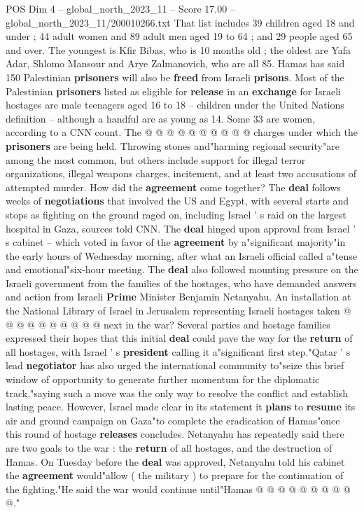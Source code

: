 \begin{textsample}{POS Dim 4 – global\_north\_2023\_11 – Score 17.00 – global\_north\_2023\_11/200010266.txt}
That list includes 39 children aged 18 and under ; 44 adult women and 89 adult men aged 19 to 64 ; and 29 people aged 65 and over.
The youngest is Kfir Bibas, who is 10 months old ; the oldest are Yafa Adar, Shlomo Mansour and Arye Zalmanovich, who are all 85.
Hamas has said 150 Palestinian \textbf{prisoners} will also be \textbf{freed} from Israeli \textbf{prisons}.
Most of the Palestinian \textbf{prisoners} listed as eligible for \textbf{release} in an \textbf{exchange} for Israeli hostages are male teenagers aged 16 to 18 -- children under the United Nations definition -- although a handful are as young as 14.
Some 33 are women, according to a CNN count.
The @ @ @ @ @ @ @ @ @ @ charges under which the \textbf{prisoners} are being held.
Throwing stones and"harming regional security"are among the most common, but others include support for illegal terror organizations, illegal weapons charges, incitement, and at least two accusations of attempted murder.
How did the \textbf{agreement} come together?
The \textbf{deal} follows weeks of \textbf{negotiations} that involved the US and Egypt, with several starts and stops as fighting on the ground raged on, including Israel ' s raid on the largest hospital in Gaza, sources told CNN.
The \textbf{deal} hinged upon approval from Israel ' s cabinet -- which voted in favor of the \textbf{agreement} by a"significant majority"in the early hours of Wednesday morning, after what an Israeli official called a"tense and emotional"six-hour meeting.
The \textbf{deal} also followed mounting pressure on the Israeli government from the families of the hostages, who have demanded answers and action from Israeli \textbf{Prime} Minister Benjamin Netanyahu.
An installation at the National Library of Israel in Jerusalem representing Israeli hostages taken @ @ @ @ @ @ @ @ @ @ next in the war?
Several parties and hostage families expressed their hopes that this initial \textbf{deal} could pave the way for the \textbf{return} of all hostages, with Israel ' s \textbf{president} calling it a"significant first step."Qatar ' s lead \textbf{negotiator} has also urged the international community to"seize this brief window of opportunity to generate further momentum for the diplomatic track,"saying such a move was the only way to resolve the conflict and establish lasting peace.
However, Israel made clear in its statement it \textbf{plans} to \textbf{resume} its air and ground campaign on Gaza"to complete the eradication of Hamas"once this round of hostage \textbf{releases} concludes.
Netanyahu has repeatedly said there are two goals to the war : the \textbf{return} of all hostages, and the destruction of Hamas.
On Tuesday before the \textbf{deal} was approved, Netanyahu told his cabinet the \textbf{agreement} would"allow ( the military ) to prepare for the continuation of the fighting."He said the war would continue until"Hamas @ @ @ @ @ @ @ @ @ @."

\end{textsample}
